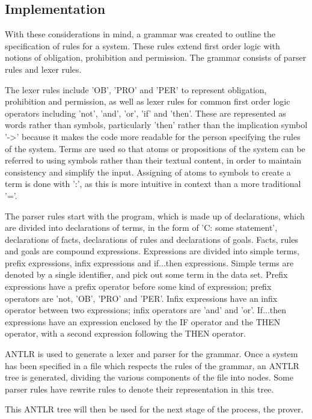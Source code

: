 \documentclass{l4proj}
\begin{document}
\subsection{Implementation}
With these considerations in mind, a grammar was created to outline the specification of rules for a system. These rules extend first order logic with notions of obligation, prohibition and permission. The grammar consists of parser rules and lexer rules. 

The lexer rules include 'OB', 'PRO' and 'PER' to represent obligation, prohibition and permission, as well as lexer rules for common first order logic operators including 'not', 'and', 'or', 'if' and 'then'. These are represented as words rather than symbols, particularly 'then' rather than the implication symbol '->' because it makes the code more readable for the person specifying the rules of the system. Terms are used so that atoms or propositions of the system can be referred to using symbols rather than their textual content, in order to maintain consistency and simplify the input. Assigning of atoms to symbols to create a term is done with ':', as this is more intuitive in context than a more traditional '='. 

The parser rules start with the program, which is made up of declarations, which are divided into declarations of terms, in the form of 'C: some statement', declarations of facts, declarations of rules and declarations of goals. Facts, rules and goals are compound expressions. Expressions are divided into simple terms, prefix expressions, infix expressions and if...then expressions. Simple terms are denoted by a single identifier, and pick out some term in the data set. Prefix expressions have a prefix operator before some kind of expression; prefix operators are 'not, 'OB', 'PRO' and 'PER'. Infix expressions have an infix operator between two expressions; infix operators are 'and' and 'or'. If...then expressions have an expression enclosed by the IF operator and the THEN operator, with a second expression following the THEN operator. 

ANTLR is used to generate a lexer and parser for the grammar. Once a system has been specified in a file which respects the rules of the grammar, an ANTLR tree is generated, dividing the various components of the file into nodes. Some parser rules have rewrite rules to denote their representation in this tree. 

This ANTLR tree will then be used for the next stage of the process, the prover. 
\end{document}
